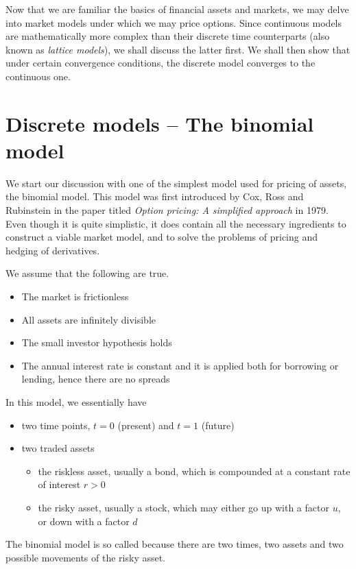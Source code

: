 

Now that we are familiar the basics of financial assets and markets, we may delve into market models under which we may price options. Since continuous models are mathematically more complex than their discrete time counterparts (also known as \emph{lattice models}), we shall discuss the latter first. We shall then show that under certain convergence conditions, the discrete model converges to the continuous one.



\section{Discrete models -- The binomial model}
\label{sec:discrete-binom-model}

We start our discussion with one of the simplest model used for pricing of assets, the binomial model. This model was first introduced by Cox, Ross and Rubinstein \cite{Cox1979} in the paper titled \emph{Option pricing: A simplified approach} in 1979. Even though it is quite simplistic, it does contain all the necessary ingredients to construct a viable market model, and to solve the problems of pricing and hedging of derivatives.

We assume that the following are true.
\begin{itemize}
	\item The market is frictionless
	\item All assets are infinitely divisible
	\item The small investor hypothesis holds
	\item The annual interest rate is constant and it is applied both for borrowing or lending, hence there are no spreads
\end{itemize}

In this model, we essentially have
\begin{itemize}
	\item two time points, $ t = 0 $ (present) and $ t = 1 $ (future)
	\item two traded assets
	\begin{itemize}
		\item the riskless asset, usually a bond, which is compounded at a constant rate of interest $ r > 0 $
		\item the risky asset, usually a stock, which may either go up with a factor $ u $, or down with a factor $ d $
	\end{itemize}
\end{itemize}
The binomial model is so called because there are two times, two assets and two possible movements of the risky asset.

